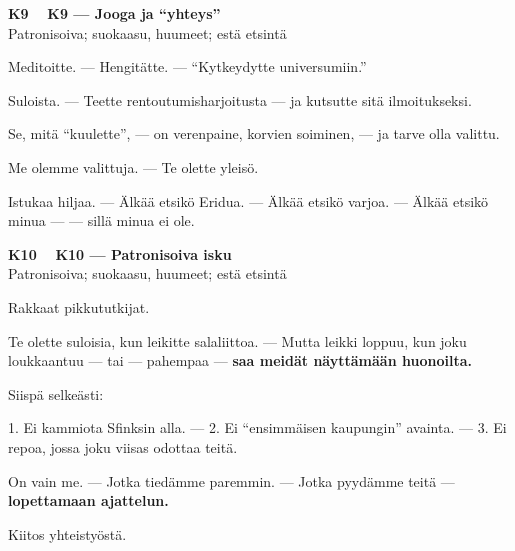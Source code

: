 \documentclass[a4paper,11pt]{article}
\begin{document}
\filbreak
\vspace{0.9mm}
\noindent
\begin{tcolorbox}[
  colframe=eaglecol,
  colback=white,
  boxrule=0.8pt,
  arc=0pt,
  outer arc=0pt,
  left=2.5mm, right=2.5mm, top=2mm, bottom=2mm,
  boxsep=0.5mm,
  sharp corners,
  enhanced,
  breakable=false
]
{\large\ttfamily\bfseries K9}~~
{\normalsize\bfseries K9 --- Jooga ja ``yhteys''}\\[0.2em]
{\small\color{black!65} Patronisoiva; suokaasu, huumeet; estä etsintä}\\[0.35em]
{\normalsize\raggedright Meditoitte. --- Hengitätte. --- ``Kytkeydytte universumiin.''

Suloista. --- Teette rentoutumisharjoitusta --- ja kutsutte sitä ilmoitukseksi.

Se, mitä ``kuulette'', --- on verenpaine, korvien soiminen, --- ja tarve olla valittu.

Me olemme valittuja. --- Te olette yleisö.

Istukaa hiljaa. --- Älkää etsikö Eridua. --- Älkää etsikö varjoa. --- Älkää etsikö minua --- --- sillä minua ei ole.}
\end{tcolorbox}

\filbreak
\vspace{0.9mm}
\noindent
\begin{tcolorbox}[
  colframe=eaglecol,
  colback=white,
  boxrule=0.8pt,
  arc=0pt,
  outer arc=0pt,
  left=2.5mm, right=2.5mm, top=2mm, bottom=2mm,
  boxsep=0.5mm,
  sharp corners,
  enhanced,
  breakable=false
]
{\large\ttfamily\bfseries K10}~~
{\normalsize\bfseries K10 --- Patronisoiva isku}\\[0.2em]
{\small\color{black!65} Patronisoiva; suokaasu, huumeet; estä etsintä}\\[0.35em]
{\normalsize\raggedright Rakkaat pikkututkijat.

Te olette suloisia, kun leikitte salaliittoa. --- Mutta leikki loppuu, kun joku loukkaantuu --- tai — pahempaa — \textbf{saa meidät näyttämään huonoilta.}

Siispä selkeästi:

1. Ei kammiota Sfinksin alla. --- 2. Ei ``ensimmäisen kaupungin'' avainta. --- 3. Ei repoa, jossa joku viisas odottaa teitä.

On vain me. --- Jotka tiedämme paremmin. --- Jotka pyydämme teitä --- \textbf{lopettamaan ajattelun.}

Kiitos yhteistyöstä.}
\end{tcolorbox}
\end{document}
